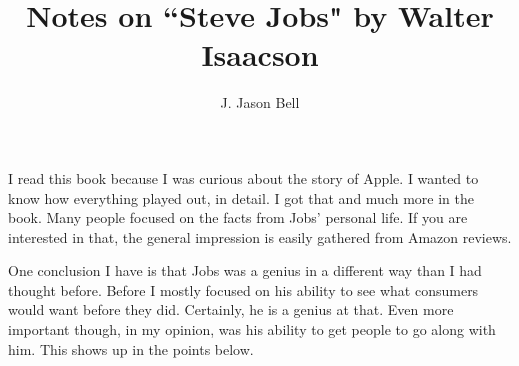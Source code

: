 \documentclass[11pt, oneside]{article}   	%
\title{Notes on ``Steve Jobs" by Walter Isaacson}
\author{J. Jason Bell}
\begin{document}
 \maketitle

I read this book because I was curious about the story of Apple.  I wanted to know how everything played out, in detail.  I got that and much more in the book.  Many people focused on the facts from Jobs' personal life.  If you are interested in that, the general impression is easily gathered from Amazon reviews.

One conclusion I have is that Jobs was a genius in a different way than I had thought before.  Before I mostly focused on his ability to see what consumers would want before they did.  Certainly, he is a genius at that.  Even more important though, in my opinion, was his ability to get people to go along with him.  This shows up in the points below.  
\end{document}
